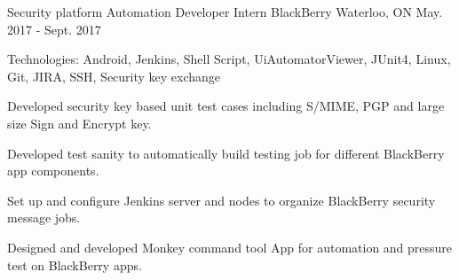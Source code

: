 \begin{cventries}
  \cventry
    {Security platform Automation Developer Intern}
    {BlackBerry}
    {Waterloo, ON}
    {May. 2017 - Sept. 2017}
    {
      \begin{cvitems}
        \item {Technologies: Android, Jenkins, Shell Script, UiAutomatorViewer, JUnit4, Linux, Git, JIRA, SSH, Security key exchange}
        \item {Developed security key based unit test cases including S/MIME, PGP and large size Sign and Encrypt key.}
        \item {Developed test sanity to automatically build testing job for different BlackBerry app components.}
        \item {Set up and configure Jenkins server and nodes to organize BlackBerry security message jobs.}
        \item {Designed and developed Monkey command tool App for automation and pressure test on BlackBerry apps.}
      \end{cvitems}
    }
  
    
    

\end{cventries}
